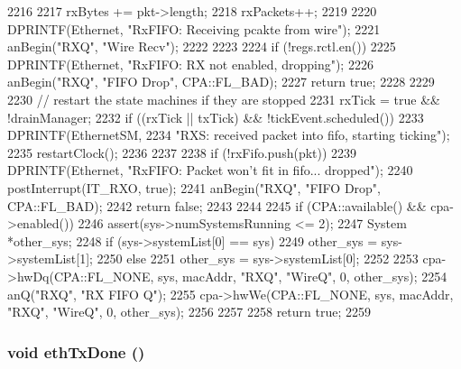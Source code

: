 \begin{DoxyCode}
2216 {
2217     rxBytes += pkt->length;
2218     rxPackets++;
2219 
2220     DPRINTF(Ethernet, "RxFIFO: Receiving pcakte from wire\n");
2221     anBegin("RXQ", "Wire Recv");
2222 
2223 
2224     if (!regs.rctl.en()) {
2225         DPRINTF(Ethernet, "RxFIFO: RX not enabled, dropping\n");
2226         anBegin("RXQ", "FIFO Drop", CPA::FL_BAD);
2227         return true;
2228     }
2229 
2230     // restart the state machines if they are stopped
2231     rxTick = true && !drainManager;
2232     if ((rxTick || txTick) && !tickEvent.scheduled()) {
2233         DPRINTF(EthernetSM,
2234                 "RXS: received packet into fifo, starting ticking\n");
2235         restartClock();
2236     }
2237 
2238     if (!rxFifo.push(pkt)) {
2239         DPRINTF(Ethernet, "RxFIFO: Packet won't fit in fifo... dropped\n");
2240         postInterrupt(IT_RXO, true);
2241         anBegin("RXQ", "FIFO Drop", CPA::FL_BAD);
2242         return false;
2243     }
2244 
2245     if (CPA::available() && cpa->enabled()) {
2246         assert(sys->numSystemsRunning <= 2);
2247         System *other_sys;
2248         if (sys->systemList[0] == sys)
2249             other_sys = sys->systemList[1];
2250         else
2251             other_sys = sys->systemList[0];
2252 
2253         cpa->hwDq(CPA::FL_NONE, sys, macAddr, "RXQ", "WireQ", 0, other_sys);
2254         anQ("RXQ", "RX FIFO Q");
2255         cpa->hwWe(CPA::FL_NONE, sys, macAddr, "RXQ", "WireQ", 0, other_sys);
2256     }
2257 
2258     return true;
2259 }
\end{DoxyCode}
\hypertarget{classIGbE_a4b170caf60b0a01672ab8e8e3e4dff10}{
\subsubsection[{ethTxDone}]{\setlength{\rightskip}{0pt plus 5cm}void ethTxDone ()}}
\label{classIGbE_a4b170caf60b0a01672ab8e8e3e4dff10}



